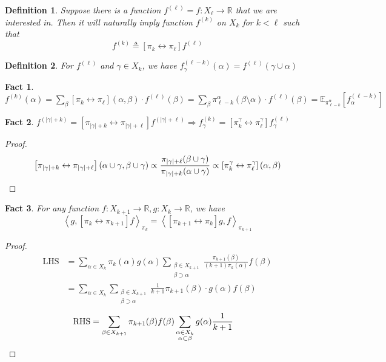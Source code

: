 \documentclass{article}
\newtheorem{define}{Definition}[section]
\newtheorem{fact}{Fact}[section]
\def\Op#1#2{\left[#1 \leftrightarrow #2\right]}
\def\<{\left\langle}
\def\>{\right\rangle}
\begin{document}
\begin{define}
  Suppose there is a function $f^{(\ell)} = f : X_\ell \to \mathbb{R}$ that we are interested in. Then it will naturally imply function $f^{(k)}$ on $X_k$ for $k < \ell$ such that
  \[f^{(k)} \triangleq \Op{\pi_k}{\pi_\ell}f^{(\ell)}\]
\end{define}

\begin{define}
  For $f^{(\ell)}$ and $\gamma\in X_k$, we have $f^{(\ell-k)}_\gamma(\alpha) = f^{(\ell)}(\gamma\cup\alpha)$
\end{define}

\begin{fact}
  $f^{(k)}(\alpha) = \sum_{\beta} \Op{\pi_k}{\pi_\ell}(\alpha, \beta) \cdot f^{(\ell)}(\beta) = \sum_\beta \pi^\alpha_{\ell-k}(\beta\setminus\alpha) \cdot f^{(\ell)}(\beta) = \mathbb{E}_{\pi^\alpha_{\ell-k}}[f_\alpha^{(\ell-k)}]$
\end{fact}

\begin{fact}\label{fact:f-consistent}
  $f^{(|\gamma|+k)} = \Op{\pi_{|\gamma|+k}}{\pi_{|\gamma|+\ell}} f^{(|\gamma| + \ell)} \Rightarrow f^{(k)}_\gamma = \Op{\pi^\gamma_k}{\pi^\gamma_\ell} f^{(\ell)}_\gamma$
\end{fact}
\begin{proof}
  \[\Op{\pi_{|\gamma| + k}}{\pi_{|\gamma| + \ell}}(\alpha\cup\gamma, \beta\cup\gamma) \propto \frac{\pi_{|\gamma|+\ell}(\beta\cup\gamma)}{\pi_{|\gamma|+k}(\alpha\cup\gamma)} \propto \Op{\pi_k^\gamma}{\pi_\ell^\gamma}(\alpha, \beta)\qedhere\]
\end{proof}

\begin{fact}
  For any function $f: X_{k+1}\to\mathbb{R}, g: X_k \to \mathbb{R}$, we have
  \[\<g, \Op{\pi_k}{\pi_{k+1}} f\>_{\pi_k} = \<\Op{\pi_{k+1}}{\pi_k} g, f\>_{\pi_{k+1}}\]
\end{fact}
\begin{proof}
  \begin{align*}
    \mathrm{LHS} &= \sum_{\alpha\in X_k} \pi_k(\alpha) g(\alpha) \sum_{\substack{\beta\in X_{k+1} \\ \beta \supset \alpha}} \frac{\pi_{k+1}(\beta)}{(k+1)\pi_k(\alpha)} f(\beta) \\
    &= \sum_{\alpha\in X_k}\sum_{\substack{\beta\in X_{k+1}\\\beta\supset\alpha}} \frac{1}{k+1} \pi_{k+1}(\beta) \cdot g(\alpha) f(\beta)
  \end{align*}
  \begin{align*}
    \mathrm{RHS} &= \sum_{\beta\in X_{k+1}} \pi_{k+1}(\beta) f(\beta) \sum_{\substack{\alpha \in X_k \\ \alpha \subset \beta}} g(\alpha) \frac{1}{k+1} \qedhere
  \end{align*}
\end{proof}
\end{document}
